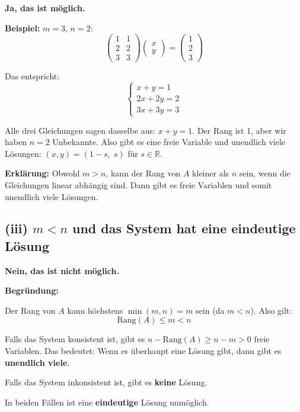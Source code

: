 \documentclass[a4paper,12pt]{article}
\begin{document}
\textbf{Ja, das ist möglich.}

\textbf{Beispiel:} $m = 3$, $n = 2$:
\[
\begin{pmatrix} 1 & 1 \\ 2 & 2 \\ 3 & 3 \end{pmatrix}
\begin{pmatrix} x \\ y \end{pmatrix}
=
\begin{pmatrix} 1 \\ 2 \\ 3 \end{pmatrix}
\]

Das entspricht:
\[
\begin{cases}
x + y = 1 \\
2x + 2y = 2 \\
3x + 3y = 3
\end{cases}
\]

Alle drei Gleichungen sagen dasselbe aus: $x + y = 1$.
Der Rang ist 1, aber wir haben $n = 2$ Unbekannte.
Also gibt es eine freie Variable und unendlich viele Lösungen: $(x, y) = (1 - s,\; s)$ für $s \in \mathbb{R}$.

\textbf{Erklärung:} Obwohl $m > n$, kann der Rang von $A$ kleiner als $n$ sein, wenn die Gleichungen linear abhängig sind. Dann gibt es freie Variablen und somit unendlich viele Lösungen.

\bigskip

\subsection*{(iii) $m < n$ und das System hat eine eindeutige Lösung}

\textbf{Nein, das ist nicht möglich.}

\textbf{Begründung:}

Der Rang von $A$ kann höchstens $\min(m, n) = m$ sein (da $m < n$).
Also gilt:
\[
\text{Rang}(A) \leq m < n
\]

Falls das System konsistent ist, gibt es $n - \text{Rang}(A) \geq n - m > 0$ freie Variablen.
Das bedeutet: Wenn es überhaupt eine Lösung gibt, dann gibt es \textbf{unendlich viele}.

Falls das System inkonsistent ist, gibt es \textbf{keine} Lösung.

In beiden Fällen ist eine \textbf{eindeutige} Lösung unmöglich.
\end{document}
